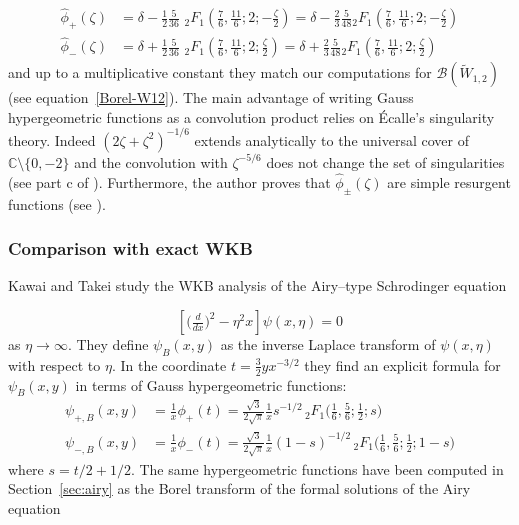 \documentclass{article}
\newcommand{\C}{\mathbb{C}}
\newcommand{\series}[1]{\tilde{#1}}
\newcommand{\borel}{\mathcal{B}}
\theoremstyle{definition}
\theoremstyle{plain}
\begin{document}
\begin{align*}
\hat{\phi}_+(\zeta)&=\delta-\frac{1}{2}\frac{5}{36}\,\, {}_2F_1\left(\frac{7}{6},\frac{11}{6};2;-\frac{\zeta}{2}\right)=\delta-\frac{2}{3}\frac{5}{48} {}_2F_1\left(\frac{7}{6},\frac{11}{6};2;-\frac{\zeta}{2}\right)\\
\hat{\phi}_-(\zeta)&=\delta+\frac{1}{2}\frac{5}{36}\,\, {}_2F_1\left(\frac{7}{6},\frac{11}{6};2;\frac{\zeta}{2}\right)=\delta+\frac{2}{3}\frac{5}{48} {}_2F_1\left(\frac{7}{6},\frac{11}{6};2;\frac{\zeta}{2}\right)
\end{align*} 
and up to a multiplicative constant they match our computations for $\borel(\tilde{W}_{1,2})$ (see equation~\eqref{Borel-W12}).
The main advantage of writing Gauss hypergeometric functions as a convolution product relies on \'Ecalle's singularity theory. Indeed $(2\zeta+\zeta^2)^{-1/6}$ extends analytically to the universal cover of $\C\setminus\lbrace 0,-2\rbrace$ and the convolution with $\zeta^{-5/6}$ does not change the set of singularities (see part c of \cite[Section 6.14.5]{diverg-resurg-i}). Furthermore, the author proves that $\hat{\phi}_{\pm}(\zeta)$ are simple resurgent functions (see \cite[Lemma 6.106]{diverg-resurg-i}). %

\subsubsection{Comparison with exact WKB}

Kawai and Takei study the WKB analysis of the Airy--type Schrodinger equation

\begin{equation}
\label{WKB_Airy} 
\left[\big(\tfrac{d}{dx}\big)^2 - \eta^2 x \right] \psi(x, \eta) = 0 
\end{equation}
as $\eta\to\infty$. They define $\psi_B(x, y)$ as the inverse Laplace transform of $\psi(x, \eta)$ with respect to $\eta$. In the coordinate $t=\frac{3}{2}yx^{-3/2}$ they find an explicit formula for $\psi_B(x,y)$ in terms of Gauss hypergeometric functions:
\begin{align*}
\psi_{+,B}(x,y)&=\frac{1}{x}\phi_+(t)=\frac{\sqrt{3}}{2\sqrt{\pi}}\frac{1}{x}s^{-1/2}\, {}_2F_1\big(\tfrac{1}{6},\tfrac{5}{6};\tfrac{1}{2};s\big)\\
\psi_{-,B}(x,y)&=\frac{1}{x}\phi_-(t)=\frac{\sqrt{3}}{2\sqrt{\pi}}\frac{1}{x}(1-s)^{-1/2}\, {}_2F_1\big(\tfrac{1}{6},\tfrac{5}{6};\tfrac{1}{2};1-s\big)
\end{align*}
where $s=t/2+1/2$. 
The same hypergeometric functions have been computed in Section~\ref{sec:airy} as the Borel transform of the formal solutions of the Airy equation
\end{document}
